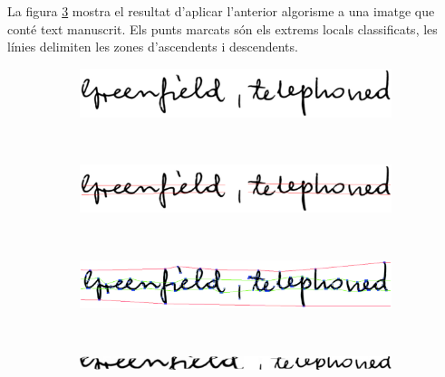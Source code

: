 La figura \ref{fig:comp_seg_mlp_result} mostra el resultat d'aplicar l'anterior algorisme a una imatge que conté text manuscrit. Els punts marcats són els extrems locals classificats, les línies delimiten les zones d'ascendents i descendents.\\

\begin{figure}
\centering
\begin{subfigure}[b]{0.9\textwidth}
\centering
\includegraphics[width=\textwidth]{images/comp_seg_original.eps}
\caption{}\label{fig:comp_seg_original}
\end{subfigure}\\
\begin{subfigure}[b]{0.9\textwidth}
\centering
\includegraphics[width=\textwidth]{images/comp_seg_heur_result.eps}
\caption{}\label{fig:comp_seg_heur_result}
\end{subfigure}\\
\begin{subfigure}[b]{0.9\textwidth}
\centering
\includegraphics[width=\textwidth]{images/comp_seg_mlp_result.eps}
\caption{}\label{fig:comp_seg_mlp_result}
\end{subfigure}\\
\begin{subfigure}[b]{0.9\textwidth}
\centering
\includegraphics[width=\textwidth]{images/comp_seg_heur_norm.eps}
\caption{}\label{fig:comp_seg_heur_norm}
\end{subfigure}\\

\end{figure}
